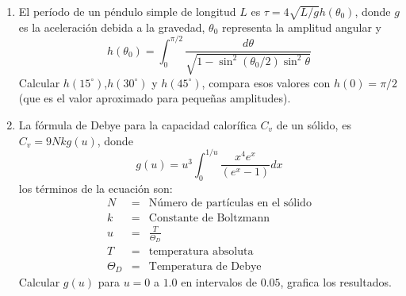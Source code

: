 \documentclass[11pt]{article}
\begin{document}
\begin{enumerate}
\item El per\'{i}odo de un p\'{e}ndulo simple de longitud $L$ es $\tau = 4 \sqrt{L/g} h(\theta_{0})$, donde $g$ es la aceleraci\'{o}n debida a la gravedad, $\theta_{0}$ representa la amplitud angular y
\[ h(\theta_{0}) = \int_{0}^{\pi/2} \dfrac{d\theta}{\sqrt{1 - \sin^{2}(\theta_{0}/2)\sin^{2} \theta}} \]
Calcular $h(15^{\circ})$,$h(30^{\circ})$ y $h(45^{\circ})$, compara esos valores con $h(0)=\pi/2$ (que es el valor aproximado para pequeñas amplitudes).
\item La f\'{o}rmula de Debye para la capacidad calor\'{i}fica $C_{v}$ de un s\'{o}lido, es \\ $C_{v} = 9 Nkg(u)$, donde
\[g(u) = u^{3} \int_{0}^{1/u} \dfrac{x^{4}e^{x}}{(e^{x}-1)}dx\]
los t\'{e}rminos de la ecuaci\'{o}n son:
\begin{eqnarray*}
N &=& \text{N\'{u}mero de part\'{i}culas en el s\'{o}lido} \\
k &=& \text{Constante de Boltzmann} \\
u &=& \frac{T}{\Theta_{D}} \\
T &=& \text{temperatura absoluta} \\
\Theta_{D} &=& \text{Temperatura de Debye}
\end{eqnarray*}
Calcular $g(u)$ para $u=0$ a $1.0$ en intervalos de $0.05$, grafica los resultados.
\end{enumerate}
\end{document}
